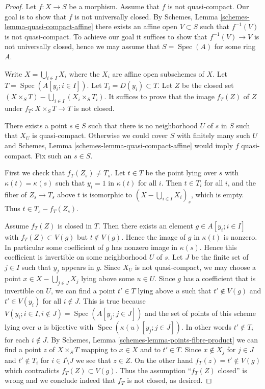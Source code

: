 \documentclass[10pt,a4paper]{amsart}
\theoremstyle{plain}
\theoremstyle{definition}
\theoremstyle{remark}
\numberwithin{equation}{subsection}
\def\Spec{\mathop{\mathrm{Spec}}}
\begin{document}
\begin{proof}
Let $f : X \to S$ be a morphism. Assume that $f$ is not quasi-compact.
Our goal is to show that $f$ is not universally closed. By
Schemes, Lemma \ref{schemes-lemma-quasi-compact-affine}
there exists an affine open $V \subset S$ such that $f^{-1}(V)$ is
not quasi-compact. To achieve our goal it suffices to show that
$f^{-1}(V) \to V$ is not universally closed, hence we may assume that
$S = \Spec(A)$ for some ring $A$.

\medskip\noindent
Write $X = \bigcup_{i \in I} X_i$ where the $X_i$ are affine open subschemes
of $X$.  Let $T = \Spec(A[y_i ; i \in I])$.
Let $T_i = D(y_i) \subset T$. Let $Z$ be the closed set
$(X \times_S T) - \bigcup_{i \in I} (X_i \times_S T_i)$.  It suffices to
prove that the image $f_T(Z)$ of $Z$ under $f_T : X \times_S T \to T$
is not closed.

\medskip\noindent
There exists a point $s \in S$ such that there is no
neighborhood $U$ of $s$ in $S$ such that $X_U$ is quasi-compact.
Otherwise we could cover $S$ with finitely many such $U$ and
Schemes, Lemma \ref{schemes-lemma-quasi-compact-affine}
would imply $f$ quasi-compact. Fix such an $s \in S$.

\medskip\noindent
First we check that $f_T(Z_s) \ne T_s$.  Let $t \in T$ be the point
lying over $s$ with $\kappa(t) = \kappa(s)$ such that $y_i = 1$ in
$\kappa(t)$ for all $i$.
Then $t \in T_i$ for all $i$, and the fiber of $Z_s \to T_s$ above
$t$ is isomorphic to $(X - \bigcup_{i \in I} X_i)_s$, which is empty.
Thus $t \in T_s - f_T(Z_s)$.

\medskip\noindent
Assume $f_T(Z)$ is closed in $T$. Then there exists an element
$g \in A[y_i; i \in I]$ with $f_T(Z) \subset V(g)$ but $t \not \in V(g)$.
Hence the image of $g$ in $\kappa(t)$ is nonzero. In particular some
coefficient of $g$ has nonzero image in $\kappa(s)$. Hence this coefficient is
invertible on some neighborhood $U$ of $s$. Let $J$ be the finite set of
$j \in I$ such that $y_j$ appears in $g$. Since $X_U$ is not quasi-compact,
we may choose a point $x \in X - \bigcup_{j \in J} X_j$ lying above some
$u \in U$. Since $g$ has a coefficient that is invertible on $U$, we can
find a point $t' \in T$ lying above $u$ such that $t' \not \in V(g)$ and
$t' \in V(y_i)$ for all $i \notin J$. This is true because
$V(y_i; i \in I, i \not\in J) = \Spec(A[y_j; j\in J])$
and the set of points of this scheme lying over $u$ is bijective
with $\Spec(\kappa(u)[y_j; j \in J])$. In other words $t' \notin T_i$
for each $i \notin J$. By
Schemes, Lemma \ref{schemes-lemma-points-fibre-product}
we can find a point $z$ of $X \times_S T$ mapping to $x \in X$ and to
$t' \in T$. Since $x \not \in X_j$ for $j \in J$ and $t' \not \in T_i$
for $i \in I \setminus J$ we see that $z \in Z$. On the other hand
$f_T(z) = t' \not \in V(g)$ which contradicts $f_T(Z) \subset V(g)$.
Thus the assumption ``$f_T(Z)$ closed'' is wrong and we conclude indeed
that $f_T$ is not closed, as desired.
\end{proof}
\end{document}
